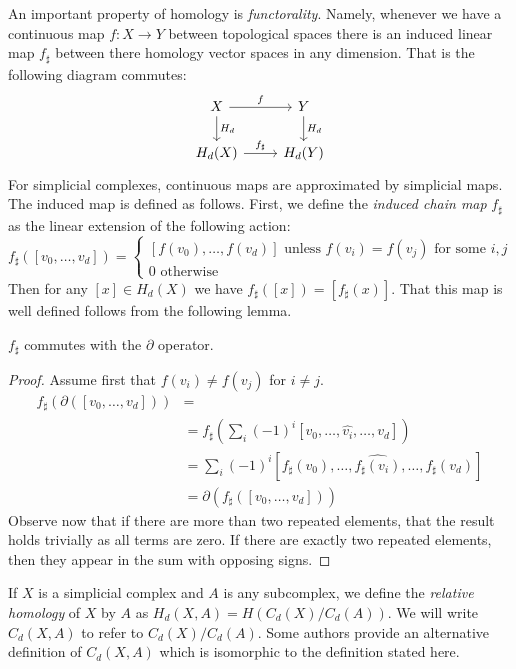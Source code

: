 An important property of homology is \emph{functorality}. Namely, whenever we have a continuous map $f: X \rightarrow Y$ between topological spaces there is an induced linear map $f_\sharp$ between there homology vector spaces in any dimension. That is the following diagram commutes:
\[ \begin{tikzcd}
X \arrow{r}{f}\arrow{d}{H_d} & Y \arrow{d}{H_d} \\
H_d(X) \arrow{r}{f_{\sharp}} & H_d(Y)
\end{tikzcd} \]
For simplicial complexes, continuous maps are approximated by simplicial maps. The induced map is defined as follows. First, we define the \emph{induced chain map} $f_\sharp$ as the linear extension of the following action: 
\[ f_\sharp([v_0, \ldots, v_d]) = 
\begin{cases} 
    [f(v_0), \ldots, f(v_d)] \textrm{ unless } f(v_i) = f(v_j) \textrm{ for some } i,j \\
    0 \textrm{ otherwise}
   \end{cases}
\]
Then for any $[x] \in H_d(X)$ we have $f_\sharp([x]) = [f_{\sharp}(x)]$.  That this map is well defined follows from 
the following lemma.
\begin{lemma}
$f_\sharp$ commutes with the $\partial$ operator. 
\end{lemma}
\begin{proof}
Assume first that $f(v_i) \neq f(v_j)$ for $i \neq j$.
\begin{align*}
f_\sharp(\partial([v_0, \ldots, v_d])) &= \\
&= f_{\sharp}(\sum_i (-1)^i[v_0, \ldots, \hat{v_i}, \ldots, v_d])  \\
&=  \sum_i(-1)^i [f_{\sharp}(v_0), \ldots, \widehat{f_{\sharp}(v_i)}, \ldots, f_{\sharp}(v_d)] \\
&=  \partial(f_\sharp([v_0, \ldots, v_d]))
\end{align*}
Observe now that if there are more than two repeated elements, that the result holds trivially as all terms are zero. If there are exactly two repeated elements, then they appear
in the sum with opposing signs.
\end{proof}

If $X$ is a simplicial complex and $A$ is any subcomplex, we define the \emph{relative homology} of $X$ by $A$ as $H_d(X,A) = H(C_d(X)/C_d(A))$. We will write $C_d(X,A)$ to refer to $C_d(X)/C_d(A)$.  Some authors provide an alternative definition of $C_d(X,A)$ which is isomorphic to the definition stated here.

